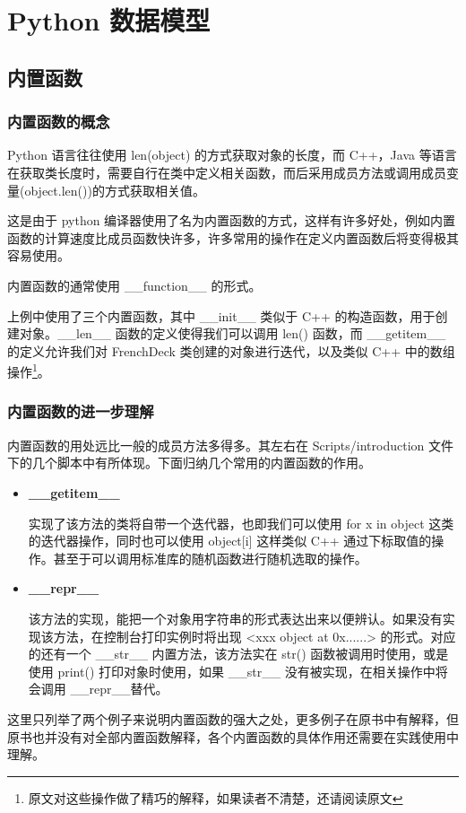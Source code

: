 \newpage
\section{Python 数据模型}
\subsection{内置函数}
\subsubsection{内置函数的概念}

Python 语言往往使用 len(object) 的方式获取对象的长度，而 C++，Java 等语言在获取类长度时，需要自行在类中定义相关函数，而后采用成员方法或调用成员变量(object.len())的方式获取相关值。

这是由于 python 编译器使用了名为内置函数的方式，这样有许多好处，例如内置函数的计算速度比成员函数快许多，许多常用的操作在定义内置函数后将变得极其容易使用。

内置函数的通常使用 \_\_function\_\_ 的形式。



上例中使用了三个内置函数，其中 \_\_init\_\_ 类似于 C++ 的构造函数，用于创建对象。\_\_len\_\_ 函数的定义使得我们可以调用 len() 函数，而 \_\_getitem\_\_ 的定义允许我们对 FrenchDeck 类创建的对象进行迭代，以及类似 C++ 中的数组操作\footnote{原文对这些操作做了精巧的解释，如果读者不清楚，还请阅读原文}。

\subsubsection{内置函数的进一步理解}

内置函数的用处远比一般的成员方法多得多。其左右在 Scripts/introduction 文件下的几个脚本中有所体现。下面归纳几个常用的内置函数的作用。

\begin{itemize}
    \item \textbf{\_\_getitem\_\_}
    
    实现了该方法的类将自带一个迭代器，也即我们可以使用 for x in object 这类的迭代器操作，同时也可以使用 object[i] 这样类似 C++ 通过下标取值的操作。甚至于可以调用标准库的随机函数进行随机选取的操作。

    \item \textbf{\_\_repr\_\_}
    
    该方法的实现，能把一个对象用字符串的形式表达出来以便辨认。如果没有实现该方法，在控制台打印实例时将出现 <xxx object at 0x......> 的形式。对应的还有一个 \_\_str\_\_ 内置方法，该方法实在 str() 函数被调用时使用，或是使用 print() 打印对象时使用，如果 \_\_str\_\_ 没有被实现，在相关操作中将会调用 \_\_repr\_\_替代。
\end{itemize}

这里只列举了两个例子来说明内置函数的强大之处，更多例子在原书中有解释，但原书也并没有对全部内置函数解释，各个内置函数的具体作用还需要在实践使用中理解。



\newpage